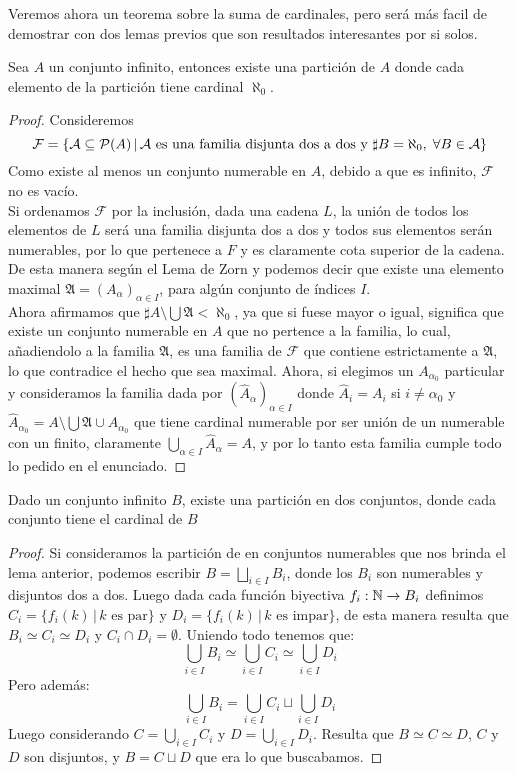 \documentclass[12pt,a4paper]{book}
\begin{document}
Veremos ahora un teorema sobre la suma de cardinales, pero será más facil de demostrar con dos lemas previos que son resultados interesantes por si solos.
\begin{lem}
Sea $A$ un conjunto infinito, entonces existe una partición de $A$ donde cada elemento de la partición tiene cardinal $\aleph_0$.
\begin{proof}
Consideremos
$$ \mathcal{F}= \{ \mathcal{A} \subseteq \P(A)\,\vert\, \mbox{$\mathcal{A}$ es una familia disjunta dos a dos y } \sharp B = \aleph_0, \; \forall B \in \mathcal{A} \}$$
Como existe al menos un conjunto numerable en $A$, debido a que es infinito, $\mathcal{F}$ no es vacío.\\
Si ordenamos $\mathcal{F}$  por la inclusión, dada una cadena $L$, la unión de todos los elementos de $L$ será una familia disjunta dos a dos y todos sus elementos serán numerables, por lo que pertenece a $F$ y es claramente cota superior de la cadena. De esta manera según el Lema de Zorn y podemos decir que existe una elemento maximal $\mathfrak{A} = (A_{\alpha})_{\alpha \in I}$, para algún conjunto de índices $I$.\\
Ahora afirmamos que $\sharp A \setminus \bigcup \mathfrak{A} < \aleph_0$, ya que si fuese mayor o igual, significa que existe un conjunto numerable en $A$ que no pertence a la familia, lo cual, añadiendolo a la familia $\mathfrak{A}$, es una familia de $\mathcal{F}$ que contiene estrictamente a $\mathfrak{A}$, lo que contradice el hecho que sea maximal. Ahora, si elegimos un $A_{\alpha_0}$ particular y consideramos la familia dada por $(\hat{A}_{\alpha})_{\alpha \in I}$ donde $\hat{A}_{i}=A_{i}$ si $i \neq \alpha_0$ y $\hat{A}_{\alpha_0}= A \setminus \bigcup \mathfrak{A} \cup A_{\alpha_0}$ que tiene cardinal numerable por ser unión de un numerable con un finito, claramente $\bigcup_{\alpha \in I} \hat{A}_{\alpha} = A$, y por lo tanto esta familia cumple todo lo pedido en el enunciado.
\end{proof}
\end{lem} 
\begin{lem}
Dado un conjunto infinito $B$, existe una partición en dos conjuntos, donde cada conjunto tiene el cardinal de $B$
\begin{proof}
Si consideramos la partición de en conjuntos numerables que nos brinda el lema anterior, podemos escribir $B = \bigsqcup_{i \in I} B_i$, donde los $B_i$ son numerables y disjuntos dos a dos. Luego dada cada función biyectiva $f_i:\N \rightarrow B_i$ definimos $C_i = \{f_i(k)\,\vert\,k\mbox{ es par}\}$ y $D_i = \{f_i(k)\,\vert\, k \mbox{ es impar}\}$, de esta manera resulta que $B_i \simeq C_i \simeq D_i$ y $C_i \cap D_i = \emptyset$. Uniendo todo tenemos que:
$$\bigcup_{i \in I} B_i \simeq \bigcup_{i \in I} C_i \simeq \bigcup_{i \in I} D_i$$ Pero además:
$$ \bigcup_{i \in I} B_i = \bigcup_{i \in I}C_i \sqcup \bigcup_{i \in I}D_i$$
Luego considerando $C = \bigcup_{i \in I} C_i$ y $D = \bigcup_{i \in I} D_i$. Resulta que $B \simeq C \simeq D$, $C$ y $D$ son disjuntos, y $B = C \sqcup D$ que era lo que buscabamos.
\end{proof}
\end{lem}
\end{document}
